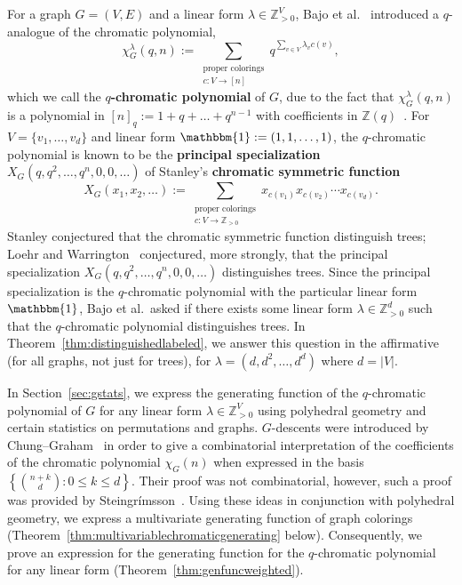 \documentclass[11pt]{amsart}
\newcommand\Def[1]{{\bf #1}}
\begin{document}
For a graph $G=(V,E)$ and a linear form $\lambda \in \mathbb{Z}_{ >0 }^V$, Bajo et al.~\cite{qchromatic}
introduced a $q$-analogue of the chromatic polynomial,
\[
    \chi_G^\lambda(q,n) := \sum_{\substack{\text{proper colorings} \\ c:V \to [n]}} q^{\sum_{v \in V} \lambda_v c(v)},
\]
which we call the \Def{$q$-chromatic polynomial} of $G$, due to the fact that $\chi_G^\lambda(q,n)$ is a polynomial
in $[n]_q := 1 + q + \dots + q^{ n-1 } $ with coefficients in $\mathbb{Z}(q)$~\cite{qchromatic}.
For $V=\{v_1,\ldots,v_d\}$ and linear form $\mathbbm{1} := (1, 1, \dots, 1)$, the $q$-chromatic polynomial is known
to be the \Def{principal specialization} $X_G(q,q^2,\hdots,q^n,0,0,\hdots)$ of Stanley's \Def{chromatic symmetric function}~\cite{stanleychromatic} 
\[
    X_G(x_1,x_2,\ldots) := \sum_{\substack{\text{proper colorings} \\ c:V \to \mathbb{Z}_{>0}}} x_{c(v_1)} x_{c(v_2)} \cdots x_{c(v_d)}.
\]
Stanley conjectured that the chromatic symmetric function distinguish trees; Loehr and
Warrington~\cite{loehrwarrington} conjectured, more strongly, that the principal specialization $X_G(q,q^2,\hdots,q^n,0,0,\hdots)$ distinguishes trees. 
Since the principal specialization is the $q$-chromatic polynomial with the particular linear form
$\mathbbm{1}$, Bajo et al.\ asked if there exists some linear form $\lambda \in \mathbb{Z}_{>0}^d$ such
that the $q$-chromatic polynomial distinguishes trees. In Theorem~\ref{thm:distinguishedlabeled}, we answer this question in the affirmative (for all graphs, not
just for trees), for
$\lambda = (d, d^2, \ldots, d^d)$ where $d = |V|$.

In Section~\ref{sec:gstats}, we express the generating function of the $q$-chromatic
polynomial of $G$ for any linear form $\lambda \in \mathbb{Z}_{ >0 }^V$ using polyhedral geometry and certain statistics on permutations and graphs. %
$G$-descents were introduced by Chung--Graham~\cite{chunggrahamcoverpol} in order to give a combinatorial
interpretation of the coefficients of the chromatic polynomial $\chi_G(n)$ when expressed in the basis
$\left\{\binom{n+k}{d} : 0 \leq k \leq d\right\}$.
Their proof was not combinatorial, however, such a proof was provided by Steingrímsson~\cite{steingrimssoncoloring}.
Using these ideas in conjunction with polyhedral geometry, we express a multivariate generating function of
graph colorings (Theorem~\ref{thm:multivariablechromaticgenerating} below). 
Consequently, we prove an expression for the generating function for the $q$-chromatic polynomial for any
linear form (Theorem~\ref{thm:genfuncweighted}).
\end{document}
